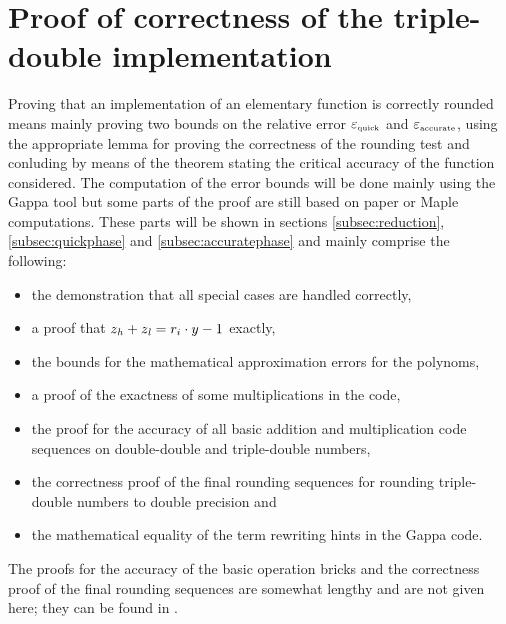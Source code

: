 \section{Proof of correctness of the triple-double implementation \label{sec:logtdproof}}
Proving that an implementation of an elementary function is correctly rounded means mainly proving two 
bounds on the relative error $\epsilon_{\mbox{\tiny quick}}$ and $\epsilon_{\mbox{\tiny accurate}}$, using the appropriate lemma for proving the
correctness of the rounding test and conluding by means of the theorem stating the critical accuracy of the 
function considered. The computation of the error bounds will be done mainly using the Gappa tool\cite{Melqu05} but
some parts of the proof are still based on paper or Maple computations. These parts will be shown in sections 
\ref{subsec:reduction}, \ref{subsec:quickphase} and \ref{subsec:accuratephase} and mainly comprise the following:
\begin{itemize}
\item the demonstration that all special cases are handled correctly, 
\item a proof that $z_\hi + z_\lo = r_i \cdot y - 1$ exactly,
\item the bounds for the mathematical approximation errors for the polynoms,
\item a proof of the exactness of some multiplications in the code,
\item the proof for the accuracy of all basic addition and multiplication code sequences on 
double-double and triple-double numbers,
\item the correctness proof of the final rounding sequences for rounding triple-double numbers to double precision and
\item the mathematical equality of the term rewriting hints in the Gappa code.
\end{itemize}
The proofs for the accuracy of the basic operation bricks and the correctness proof of the final rounding sequences
are somewhat lengthy and are not given here; they can be found in \cite{Lauter2005LIP:tripledouble}.
